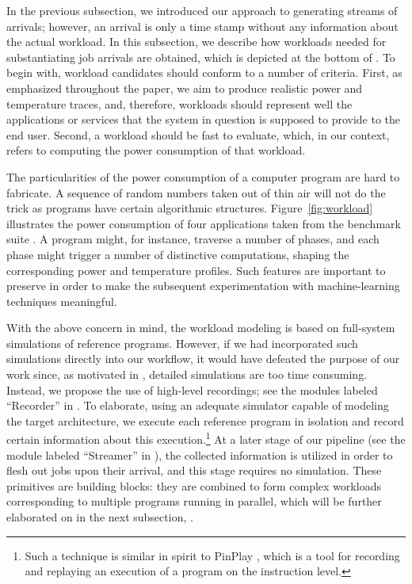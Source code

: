 
In the previous subsection, we introduced our approach to generating streams of
arrivals; however, an arrival is only a time stamp without any information about
the actual workload. In this subsection, we describe how workloads needed for
substantiating job arrivals are obtained, which is depicted at the bottom of
. To begin with, workload candidates should conform to a
number of criteria. First, as emphasized throughout the paper, we aim to produce
realistic power and temperature traces, and, therefore, workloads should
represent well the applications or services that the system in question is
supposed to provide to the end user. Second, a workload should be fast to
evaluate, which, in our context, refers to computing the power consumption of
that workload.

The particularities of the power consumption of a computer program are hard to
fabricate. A sequence of random numbers taken out of thin air will not do the
trick as programs have certain algorithmic structures.
Figure~\ref{fig:workload} illustrates the power consumption of four applications
taken from the  benchmark suite \cite{cpu2006}. A program
might, for instance, traverse a number of phases, and each phase might trigger a
number of distinctive computations, shaping the corresponding power and
temperature profiles. Such features are important to preserve in order to make
the subsequent experimentation with machine-learning techniques meaningful.

With the above concern in mind, the workload modeling is based on full-system
simulations of reference programs. However, if we had incorporated such
simulations directly into our workflow, it would have defeated the purpose of
our work since, as motivated in , detailed simulations are too
time consuming. Instead, we propose the use of high-level recordings; see the
modules labeled ``Recorder'' in . To elaborate, using an
adequate simulator capable of modeling the target architecture, we execute each
reference program in isolation and record certain information about this
execution.\footnote{Such a technique is similar in spirit to PinPlay
\cite{patil2010}, which is a tool for recording and replaying an execution of a
program on the instruction level.} At a later stage of our pipeline (see the
module labeled ``Streamer'' in ), the collected information is
utilized in order to flesh out jobs upon their arrival, and this stage requires
no simulation. These primitives are building blocks: they are combined to form
complex workloads corresponding to multiple programs running in parallel, which
will be further elaborated on in the next subsection, .

